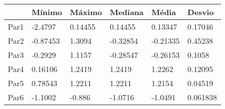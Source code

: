 \begin{tabular}{llllll}
& Mínimo & Máximo & Mediana & Média & Desvio \\ 
\hline 
Par1 & -2.4797 & 0.14455 & 0.14455 & 0.13347 & 0.17046 \\ 
Par2 & -0.87453 & 1.3094 & -0.32854 & -0.21335 & 0.45238 \\ 
Par3 & -0.2929 & 1.1157 & -0.28547 & -0.26153 & 0.1058 \\ 
Par4 & 0.16106 & 1.2419 & 1.2419 & 1.2262 & 0.12095 \\ 
Par5 & 0.78543 & 1.2211 & 1.2211 & 1.2154 & 0.04519 \\ 
Par6 & -1.1002 & -0.886 & -1.0716 & -1.0491 & 0.061838 \\ 
\hline 
\end{tabular}